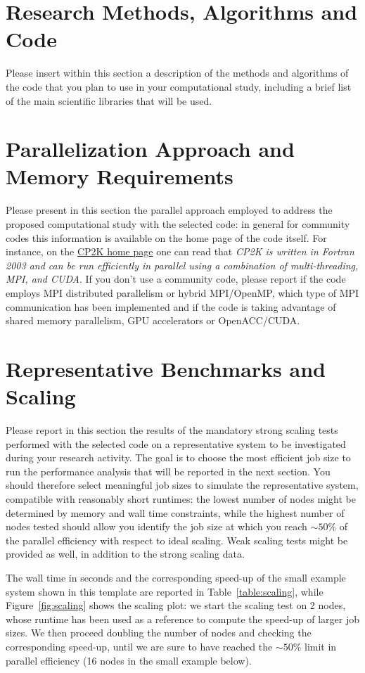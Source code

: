 \documentclass[11pt]{article}
\begin{document}
\section{Research Methods, Algorithms and Code}
Please insert within this section a description of the methods and algorithms of the code that you plan to use in your computational study, 
including a brief list of the main scientific libraries that will be used.

\section{Parallelization Approach and Memory Requirements}
Please present in this section the parallel approach employed to address the proposed computational study with the selected code: 
in general for community codes this information is available on the home page of the code itself.
For instance, on the \href{www.cp2k.org}{CP2K home page} one can read that \emph{CP2K is written in Fortran 2003 and can be run 
efficiently in parallel using a combination of multi-threading, MPI, and CUDA}.
If you don't use a community code, please report if the code employs MPI distributed parallelism or hybrid MPI/OpenMP, 
which type of MPI communication has been implemented and if the code is taking advantage of shared memory parallelism, 
GPU accelerators or OpenACC/CUDA.

\section{Representative Benchmarks and Scaling}
Please report in this section the results of the mandatory strong scaling tests performed with the selected code on a representative system 
to be investigated during your research activity. 
The goal is to choose the most efficient job size to run the performance analysis that will be reported in the next section. 
You should therefore select meaningful job sizes to simulate the representative system, compatible with reasonably short runtimes: 
the lowest number of nodes might be determined by memory and wall time constraints, while the highest number of nodes tested 
should allow you identify the job size at which you reach $\sim 50\%$ of the parallel efficiency with respect to ideal scaling. 
Weak scaling tests might be provided as well, in addition to the strong scaling data. 

The wall time in seconds and the corresponding speed-up of the small example system shown in this template are reported 
in Table~\ref{table:scaling}, while Figure~\ref{fig:scaling} shows the scaling plot: we start the scaling test 
on 2 nodes, whose runtime has been used as a reference to compute the speed-up of larger job sizes. 
We then proceed doubling the number of nodes and checking the corresponding speed-up, until we are sure to have reached the $\sim 50\%$ 
limit in parallel efficiency (16 nodes in the small example below).
\end{document}

